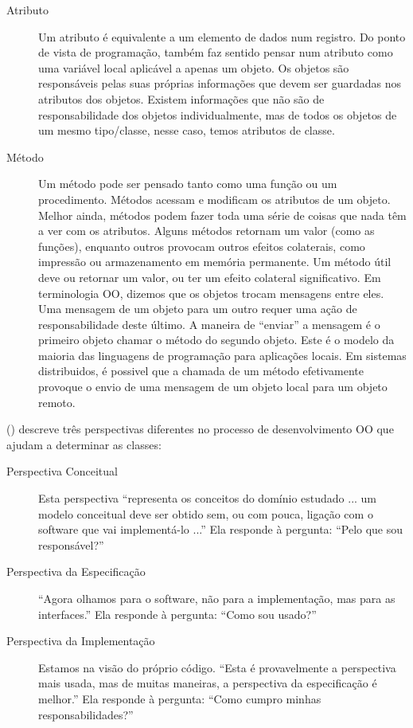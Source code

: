 \documentclass[
	11pt,				%
	openright,
	twoside,			%
	a4paper,			%
	english,			%
	french,
	brazil,				%
	sumario=tradicional
	]{abntex2}
\begin{document}
\begin{description}
\item[Atributo] Um atributo é equivalente a um elemento de dados num registro. Do ponto de vista de programação, também faz sentido pensar num atributo como uma variável local aplicável a apenas um objeto. Os objetos são responsáveis pelas suas próprias informações que devem ser guardadas nos atributos dos objetos. Existem informações que não são de responsabilidade dos objetos individualmente, mas de todos os objetos de um mesmo tipo/classe, nesse caso, temos atributos de classe.

\item[Método] Um método pode ser pensado tanto como uma função ou um procedimento. Métodos acessam e modificam os atributos de um objeto. Melhor ainda, métodos podem fazer toda uma série de coisas que nada têm a ver com os atributos. Alguns métodos retornam um valor (como as funções), enquanto outros provocam outros efeitos colaterais, como impressão ou armazenamento em memória permanente. Um método útil deve ou retornar um valor, ou ter um efeito colateral significativo. Em terminologia OO, dizemos que os objetos trocam mensagens entre eles. Uma mensagem de um objeto para um outro requer uma ação de responsabilidade deste último. A maneira de ``enviar'' a mensagem é o primeiro objeto chamar o método do segundo objeto. Este é o modelo da maioria das linguagens de programação para aplicações locais. Em sistemas distribuidos, é possivel que a chamada de um método efetivamente provoque o envio de uma mensagem de um objeto local para um objeto remoto.

\end{description}

() descreve três perspectivas diferentes no processo de desenvolvimento OO que ajudam a determinar as classes:

\begin{description}
\item[Perspectiva Conceitual] Esta perspectiva ``representa os conceitos do domínio estudado ... um modelo conceitual deve ser obtido sem, ou com pouca, ligação com o software que vai implementá-lo ...'' Ela responde à pergunta: ``Pelo que sou responsável?''

\item[Perspectiva da Especificação] ``Agora olhamos para o software, não para a implementação, mas para as interfaces.'' Ela responde à pergunta: ``Como sou usado?''

\item[Perspectiva da Implementação] Estamos na visão do próprio código. ``Esta é provavelmente a perspectiva mais usada, mas de muitas maneiras, a perspectiva da especificação é melhor.'' Ela responde à pergunta: ``Como cumpro minhas responsabilidades?''
\end{description}
\end{document}
